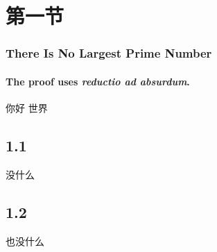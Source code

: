 \documentclass[xcolor=svgnames,serif,table,10pt]{beamer}
\begin{document}
     
\section{第一节}
\begin{frame}
  \frametitle{There Is No Largest Prime Number}
  \framesubtitle{The proof uses \textit{reductio ad absurdum}.}

  \begin{block}{你好}
    世界  
  \end{block}
\end{frame}

\subsection{1.1}
\begin{frame}
没什么
\end{frame}
\subsection{1.2}
\begin{frame}
也没什么
\end{frame}
\end{document}
